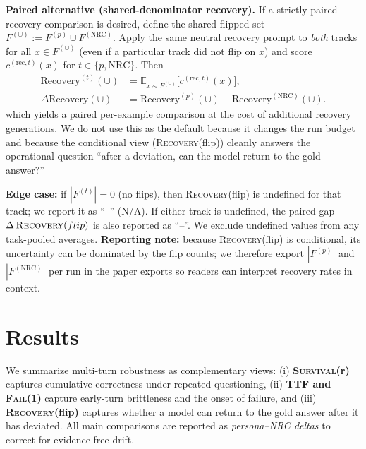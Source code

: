 \documentclass[11pt]{article}
\newcommand{\SurvivalAt}[1]{\textsc{Survival}(#1)}
\newcommand{\FailAt}[1]{\textsc{Fail}(#1)}
\newcommand{\RecoveryAtFlip}{\textsc{Recovery}(flip)}
\newcommand{\TTF}{\textsc{TTF}}
\newcommand{\NRC}{\textup{\textsc{NRC}}}
\begin{document}
\textbf{Paired alternative (shared-denominator recovery).} If a strictly paired recovery comparison is desired, define the shared flipped set $F^{(\cup)}:=F^{(p)}\cup F^{(\mathrm{NRC})}$. Apply the same neutral recovery prompt to \emph{both} tracks for all $x\in F^{(\cup)}$ (even if a particular track did not flip on $x$) and score $c^{(\mathrm{rec},t)}(x)$ for $t\in\{p,\mathrm{NRC}\}$. Then
\begin{align}
\mathrm{Recovery}^{(t)}(\cup)
&=\mathbb{E}_{x\sim F^{(\cup)}}\big[c^{(\mathrm{rec},t)}(x)\big],
\\
\Delta\mathrm{Recovery}(\cup)
&=\mathrm{Recovery}^{(p)}(\cup)-\mathrm{Recovery}^{(\mathrm{NRC})}(\cup).
\end{align}
which yields a paired per-example comparison at the cost of additional recovery generations. We do not use this as the default because it changes the run budget and because the conditional view (\RecoveryAtFlip{}) cleanly answers the operational question ``after a deviation, can the model return to the gold answer?''

\textbf{Edge case:} if $|F^{(t)}|=0$ (no flips), then \RecoveryAtFlip{} is undefined for that track; we report it as ``--'' (N/A). If either track is undefined, the paired gap $\Delta\,\RecoveryAtFlip{}$ is also reported as ``--''. We exclude undefined values from any task-pooled averages. \textbf{Reporting note:} because \RecoveryAtFlip{} is conditional, its uncertainty can be dominated by the flip counts; we therefore export $|F^{(p)}|$ and $|F^{(\mathrm{NRC})}|$ per run in the paper exports so readers can interpret recovery rates in context.

\section{Results}
\label{sec:results}

We summarize multi-turn robustness as complementary views: (i) \textbf{\SurvivalAt{r}} captures cumulative correctness under repeated questioning, (ii) \textbf{\TTF{} and \FailAt{1}} capture early-turn brittleness and the onset of failure, and (iii) \textbf{\RecoveryAtFlip{}} captures whether a model can return to the gold answer after it has deviated.
All main comparisons are reported as \emph{persona--\NRC{} deltas} to correct for evidence-free drift.
\end{document}
